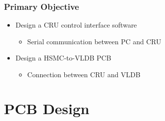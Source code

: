 \documentclass[aspectratio=43]{beamer}
\makeatletter
\newenvironment{backgroundblock}[2]{%
  \global\setbox\@backgroundblock=\vbox\bgroup%
    \unvbox\@backgroundblock%
    \vbox to0pt\bgroup\vskip#2\hbox to0pt\bgroup\hskip#1\relax%
}{\egroup\egroup\egroup}
\makeatother
\begin{document}
{


\begin{frame}
\frametitle{Primary Objective}

\begin{itemize}
\item Design a CRU control interface software
	\begin{itemize}
	\item Serial communication between PC and CRU
	\end{itemize}
\item Design a HSMC-to-VLDB PCB
	\begin{itemize}
	\item Connection between CRU and VLDB 
	\end{itemize}
\end{itemize}
\end{frame}


\section{PCB Design}
}
\end{document}
